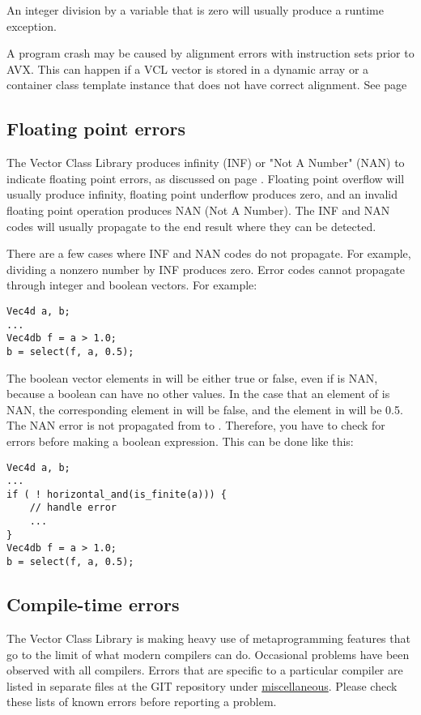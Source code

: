 \documentclass[vcl_manual.tex]{subfiles}
\begin{document}
An integer division by a variable that is zero will usually produce a runtime exception.

A program crash may be caused by alignment errors with instruction sets prior to AVX. This can happen if a VCL vector is stored in a dynamic array or a container class template instance that does not have correct alignment. See page \pageref{Alignment}


\subsection{Floating point errors}\label{FloatingPointErrors}
The Vector Class Library produces infinity (INF) or "Not A Number" (NAN) to indicate floating point errors, as discussed on page \pageref{NoExceptionTrapping}.
Floating point overflow will usually produce infinity, floating point underflow produces zero, and an invalid floating point operation produces NAN (Not A Number). The INF and NAN codes will usually propagate to the end result where they can be detected.

There are a few cases where INF and NAN codes do not propagate. For example, dividing a nonzero number by INF produces zero. Error codes cannot propagate through integer and boolean vectors. For example:

\begin{lstlisting}[frame=none]
Vec4d a, b;
...
Vec4db f = a > 1.0;
b = select(f, a, 0.5);
\end{lstlisting}

The boolean vector elements in  will be either true or false, even if  is NAN, because a boolean can have no other values. 
In the case that an element of  is NAN, the corresponding element in  will be false, and the element in  will be 0.5. The NAN error is not propagated from  to . Therefore, you have to check for errors before making a boolean expression. This can be done like this:

\begin{lstlisting}[frame=none]
Vec4d a, b;
...
if ( ! horizontal_and(is_finite(a))) {
    // handle error
    ...
}
Vec4db f = a > 1.0;
b = select(f, a, 0.5);
\end{lstlisting}


\subsection{Compile-time errors}\label{CompileTimeErrors}
The Vector Class Library is making heavy use of metaprogramming features that go to the limit of what modern compilers can do. Occasional problems have been observed with all compilers.
Errors that are specific to a particular compiler are listed in separate files at the GIT repository under 
\href{https://github.com/vectorclass/miscellaneous}{miscellaneous}. 
Please check these lists of known errors before reporting a problem.
\end{document}
